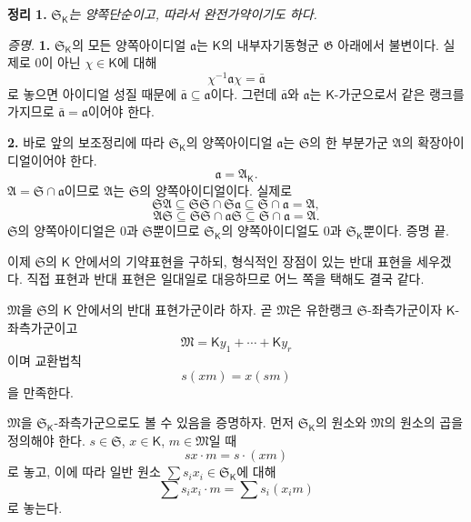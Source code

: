 \textbf{정리 1.} \emph{\(\mathfrak S_{\mathsf K}\)는 양쪽단순이고, 따라서 완전가약이기도 하다.}

\emph{증명.} \textbf{1.} \(\mathfrak S_{\mathsf K}\)의 모든 양쪽아이디얼 \(\mathfrak a\)는 \(\mathsf K\)의 내부자기동형군 \(\mathfrak G\) 아래에서 불변이다. 실제로 0이 아닌 \(\chi\in\mathsf K\)에 대해
\[
        \chi^{-1}\mathfrak a\chi=\bar{\mathfrak a}
\]
로 놓으면 아이디얼 성질 때문에 \(\bar{\mathfrak a}\subseteq\mathfrak a\)이다. 그런데 \(\bar{\mathfrak a}\)와 \(\mathfrak a\)는 \(\mathsf K\)-가군으로서 같은 랭크를 가지므로 \(\bar{\mathfrak a}=\mathfrak a\)이어야 한다.

\textbf{2.} 바로 앞의 보조정리에 따라 \(\mathfrak S_{\mathsf K}\)의 양쪽아이디얼 \(\mathfrak a\)는 \(\mathfrak S\)의 한 부분가군 \(\mathfrak A\)의 확장아이디얼이어야 한다.
\[
        \mathfrak a=\mathfrak A_{\mathsf K}.
\]
\(\mathfrak A=\mathfrak S\cap\mathfrak a\)이므로 \(\mathfrak A\)는 \(\mathfrak S\)의 양쪽아이디얼이다. 실제로
\[
\mathfrak S\mathfrak A
\subseteq\mathfrak S\mathfrak S\cap
\mathfrak S\mathfrak a
\subseteq\mathfrak S\cap\mathfrak a
=\mathfrak A,
\]
\[
\mathfrak A\mathfrak S
\subseteq\mathfrak S\mathfrak S\cap
\mathfrak a\mathfrak S
\subseteq\mathfrak S\cap\mathfrak a
=\mathfrak A.
\]
\(\mathfrak S\)의 양쪽아이디얼은 \(0\)과 \(\mathfrak S\)뿐이므로 \(\mathfrak S_{\mathsf K}\)의 양쪽아이디얼도 \(0\)과 \(\mathfrak S_{\mathsf K}\)뿐이다. 증명 끝.

이제 \(\mathfrak S\)의 \(\mathsf K\) 안에서의 기약표현을 구하되, 형식적인 장점이 있는 반대 표현을 세우겠다. 직접 표현과 반대 표현은 일대일로 대응하므로 어느 쪽을 택해도 결국 같다.

\(\mathfrak M\)을 \(\mathfrak S\)의 \(\mathsf K\) 안에서의 반대 표현가군이라 하자. 곧 \(\mathfrak M\)은 유한랭크 \(\mathfrak S\)-좌측가군이자 \(\mathsf K\)-좌측가군이고
\[
        \mathfrak M
        =\mathsf K y_1+\cdots+\mathsf K y_r
\]
이며 교환법칙
\[
        s(xm)=x(sm)
\]
을 만족한다.

\(\mathfrak M\)을 \(\mathfrak S_{\mathsf K}\)-좌측가군으로도 볼 수 있음을 증명하자. 먼저 \(\mathfrak S_{\mathsf K}\)의 원소와 \(\mathfrak M\)의 원소의 곱을 정의해야 한다. \(s\in\mathfrak S\), \(x\in\mathsf K\), \(m\in\mathfrak M\)일 때
\[
        sx\cdot m=s\cdot(xm)
\]
로 놓고, 이에 따라 일반 원소 \(\sum s_ix_i\in\mathfrak S_{\mathsf K}\)에 대해
\[
        \sum s_ix_i\cdot m
        =\sum s_i(x_i m)
\]
로 놓는다.

